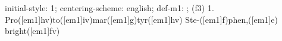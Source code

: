 initial-style: 1;
centering-scheme: english;
def-m1: \grealign;
(f3) 1. Pro([em1]hv)to([em1]iv)mar([em1]g)tyr([em1]hv) Ste-([em1]f)phen,([em1]e) bright([em1]fv)
